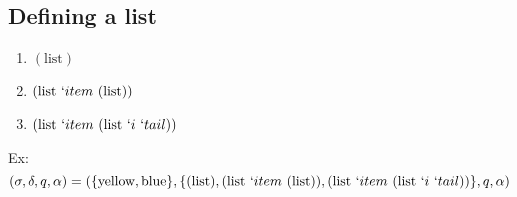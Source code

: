 \documentclass[11pt,a4paper]{report}
\newcommand{\var}[1]{`#1}
\begin{document}
\subsection{Defining a list}

\begin{enumerate}
\item $(\text{list})$
\item $(\text{list}\ \var{item}\ (\text{list}))$
\item $(\text{list}\ \var{item}\ (\text{list}\ \var{i}\ \var{tail}))$
\end{enumerate}

Ex:
\[
    (\sigma, \delta, q, \alpha ) = (\{\text{yellow}, \text{blue}\},
    \{
(\text{list}),
(\text{list}\ \var{item}\ (\text{list})),
(\text{list}\ \var{item}\ (\text{list}\ \var{i}\ \var{tail}))
    \}, q, \alpha)
\]
\end{document}
